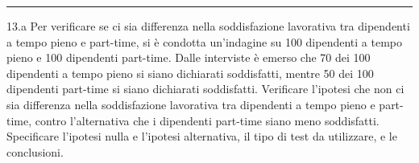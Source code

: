 \documentclass[
  11pt,
]{book}
\theoremstyle{mytheoremstyle}
\theoremstyle{mydefstyle}
\begin{document}
\begin{center}\rule{0.5\linewidth}{0.5pt}\end{center}

13.a Per verificare se ci sia differenza nella soddisfazione lavorativa tra dipendenti a tempo pieno e part-time, si è condotta un'indagine su 100 dipendenti a tempo pieno e 100 dipendenti part-time. Dalle interviste è emerso che 70 dei 100 dipendenti a tempo pieno si siano dichiarati soddisfatti, mentre 50 dei 100 dipendenti part-time si siano dichiarati soddisfatti. Verificare l'ipotesi che non ci sia differenza nella soddisfazione lavorativa tra dipendenti a tempo pieno e part-time, contro l'alternativa che i dipendenti part-time siano meno soddisfatti. Specificare l'ipotesi nulla e l'ipotesi alternativa, il tipo di test da utilizzare, e le conclusioni.
\end{document}
